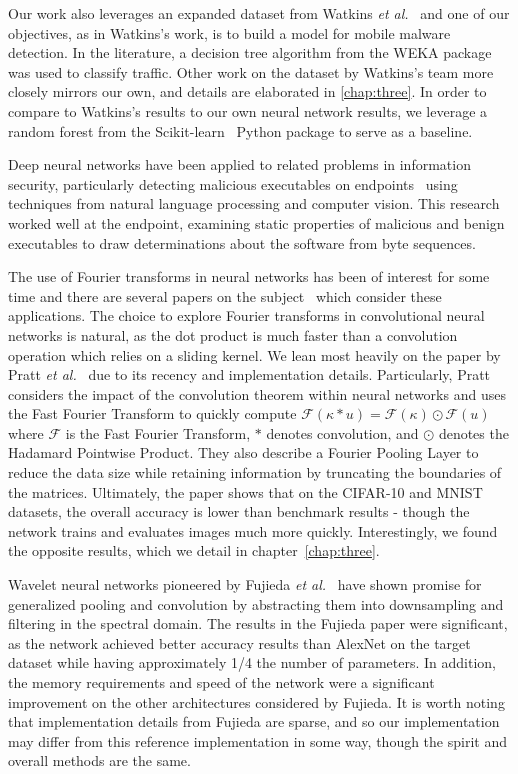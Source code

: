 Our work also leverages an expanded dataset from Watkins \textit{et al.}~\cite{watkins2013using} and one of our objectives, as in Watkins's work, is to build a model for mobile malware detection.
In the literature, a decision tree algorithm from the WEKA package was used to classify traffic.
Other work on the dataset by Watkins's team more closely mirrors our own, and details are elaborated in \ref{chap:three}.
In order to compare to Watkins's results to our own neural network results, we leverage a random forest from the Scikit-learn~\cite{scikit-learn} Python package to serve as a baseline.

Deep neural networks have been applied to related problems in information security, particularly detecting malicious executables on endpoints~\cite{raff2018malware} using techniques from natural language processing and computer vision.
This research worked well at the endpoint, examining static properties of malicious and benign executables to draw determinations about the software from byte sequences.

The use of Fourier transforms in neural networks has been of interest for some time and there are several papers on the subject~\cite{osowski2002fourier, pratt2017fcnn, highlander2016very} which consider these applications.
The choice to explore Fourier transforms in convolutional neural networks is natural, as the dot product is much faster than a convolution operation which relies on a sliding kernel. 
We lean most heavily on the paper by Pratt \textit{et al.}~\cite{pratt2017fcnn} due to its recency and implementation details. 
Particularly, Pratt considers the impact of the convolution theorem within neural networks and uses the Fast Fourier Transform to quickly compute $\mathcal{F}(\kappa * u) = \mathcal{F}(\kappa) \odot \mathcal{F}(u)$ where $\mathcal{F}$ is the Fast Fourier Transform, $*$ denotes convolution, and $\odot$ denotes the Hadamard Pointwise Product.
They also describe a Fourier Pooling Layer to reduce the data size while retaining information by truncating the boundaries of the matrices.
Ultimately, the paper shows that on the CIFAR-10 and MNIST datasets, the overall accuracy is lower than benchmark results - though the network trains and evaluates images much more quickly.
Interestingly, we found the opposite results, which we detail in chapter~\ref{chap:three}.

Wavelet neural networks pioneered by Fujieda \textit{et al.}~\cite{fujieda2017wavelet} have shown promise for generalized pooling and convolution by abstracting them into downsampling and filtering in the spectral domain.
The results in the Fujieda paper were significant, as the network achieved better accuracy results than AlexNet on the target dataset while having approximately 1/4 the number of parameters.
In addition, the memory requirements and speed of the network were a significant improvement on the other architectures considered by Fujieda.
It is worth noting that implementation details from Fujieda are sparse, and so our implementation may differ from this reference implementation in some way, though the spirit and overall methods are the same.
